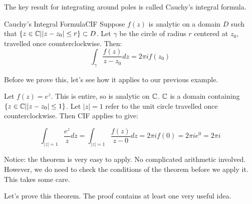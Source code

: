 The key result for integrating around poles is called Cauchy's integral formula.

\begin{thmbo}{Cauchy's Integral Formula}{CIF}
Suppose $f(z)$ is analytic on a domain $D$ such that $\{z\in\mathbb{C}||z-z_0|\le r\} \subset D$. Let $\gamma$ be the circle of radius $r$ centered at $z_0$, travelled once counterclockwise. Then:
$$\int_{\gamma} \frac{f(z)}{z - z_0}dz = 2\pi i f(z_0)$$
\end{thmbo}

Before we prove this, let's see how it applies to our previous example.

\begin{ex}{}{} Let $f(z) = e^z$. This is entire, so is analytic on $\mathbb{C}$. $\mathbb{C}$ is a domain containing $\{z\in\mathbb{C}||z-z_0|\le 1\}$. Let $|z| = 1$ refer to the unit circle travelled once counterclockwise. Then CIF applies to give:

$$\int_{|z| = 1}\frac{e^z}{z}dz = \int_{|z| = 1} \frac{f(z)}{z-0}dz = 2\pi i f(0) = 2\pi i e^0 = 2\pi i$$
\end{ex}

Notice: the theorem is very easy to apply. No complicated arithmetic involved. However, we do need to check the conditions of the theorem before we apply it. This takes some care.

Let's prove this theorem. The proof contains at least one very useful idea.

